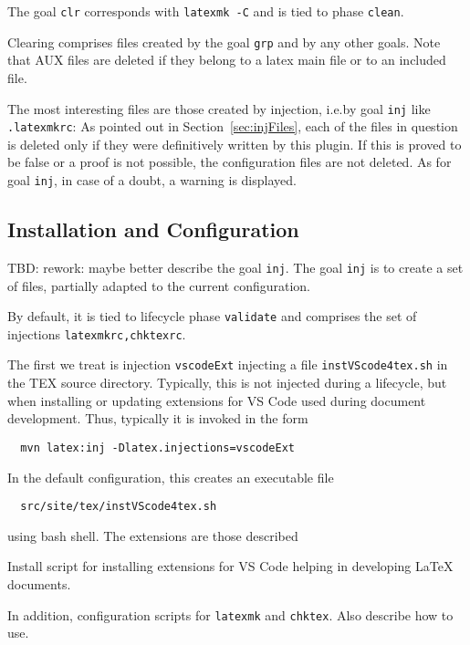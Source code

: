 The goal \texttt{clr} corresponds with \texttt{latexmk -C} and is tied to phase \texttt{clean}. 

Clearing comprises files created by the goal \texttt{grp} and by any other goals. 
Note that AUX files are deleted if they belong to a latex main file or to an included file. 

The most interesting files are those created by injection, 
i.e.\@ by goal \texttt{inj} like \texttt{.latexmkrc}: 
As pointed out in Section~\ref{sec:injFiles}, 
each of the files in question is deleted only 
if they were definitively written by this plugin. 
If this is proved to be false or a proof is not possible, 
the configuration files are not deleted. 
As for goal \texttt{inj}, in case of a doubt, a warning is displayed. 



\subsection{Installation and Configuration}\label{subsec:develConfig}

TBD\@: rework: maybe better describe the goal \texttt{inj}. 
The goal \texttt{inj} is to create a set of files, 
partially adapted to the current configuration. 



By default, it is tied to lifecycle phase \texttt{validate} 
and comprises the set of injections \texttt{latexmkrc,chktexrc}. 

The first we treat is injection \texttt{vscodeExt} 
injecting a file \texttt{instVScode4tex.sh} in the TEX source directory. 
Typically, this is not injected during a lifecycle, 
but when installing or updating extensions for VS Code 
used during document development. 
Thus, typically it is invoked in the form 
%
\begin{verbatim}
  mvn latex:inj -Dlatex.injections=vscodeExt
\end{verbatim}

\noindent
In the default configuration, this creates an executable file 
%
\begin{verbatim}
  src/site/tex/instVScode4tex.sh
\end{verbatim}
%
using bash shell. 
The extensions are those described 



Install script for installing extensions for VS Code 
helping in developing \LaTeX{} documents. 


In addition, configuration scripts for \texttt{latexmk} and \texttt{chktex}. 
Also describe how to use. 




